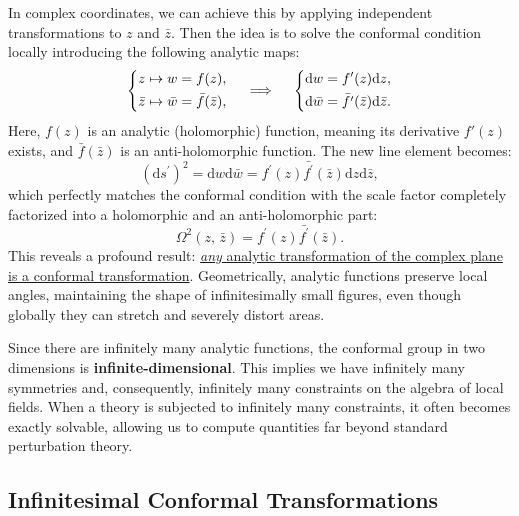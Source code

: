 In complex coordinates, we can achieve this by applying independent transformations to \(z\) and \(\bar{z}\). Then the idea is to solve the conformal condition locally introducing the following analytic maps:
\[
    \begin{dcases}
        z \mapsto w = f(z), \\
        \bar{z} \mapsto \bar{w} = \bar{f}(\bar{z}),
    \end{dcases} \quad \implies \quad \begin{dcases}
        \mathrm{d} w = f^{\prime}(z) \mathrm{d} z, \\
        \mathrm{d} \bar{w} = \bar{f^{\prime}}(\bar{z}) \mathrm{d} \bar{z}.
    \end{dcases}
\]
Here, \(f(z)\) is an analytic (holomorphic) function, meaning its derivative \(f'(z)\) exists, and \(\bar{f}(\bar{z})\) is an anti-holomorphic function. The new line element becomes:
\[
    (\mathrm{d} s^{\prime} )^2 = \mathrm{d} w \mathrm{d} \bar{w} = f^{\prime}(z) \bar{f^{\prime}}(\bar{z}) \mathrm{d} z \mathrm{d} \bar{z},
\]
which perfectly matches the conformal condition with the scale factor completely factorized into a holomorphic and an anti-holomorphic part:
\[
    \Omega^2(z, \, \bar{z}) = f^{\prime}(z) \bar{f^{\prime}}(\bar{z}).
\]
This reveals a profound result: \uline{\textit{any} analytic transformation of the complex plane is a conformal transformation}. Geometrically, analytic functions preserve local angles, maintaining the shape of infinitesimally small figures, even though globally they can stretch and severely distort areas.

Since there are infinitely many analytic functions, the conformal group in two dimensions is \textbf{infinite-dimensional}. This implies we have infinitely many symmetries and, consequently, infinitely many constraints on the algebra of local fields. When a theory is subjected to infinitely many constraints, it often becomes exactly solvable, allowing us to compute quantities far beyond standard perturbation theory.

\subsection{Infinitesimal Conformal Transformations}


